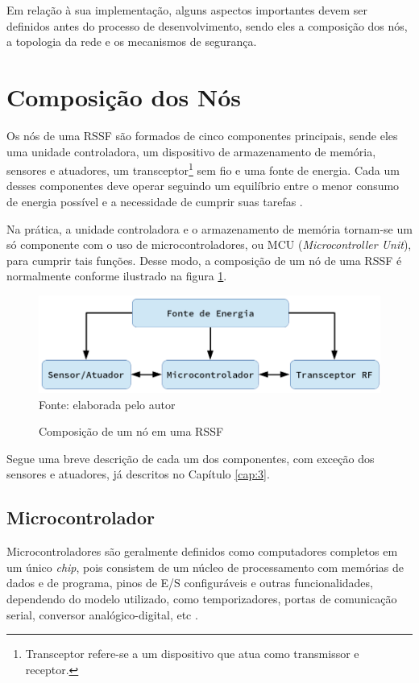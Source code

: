 Em relação à sua implementação, alguns aspectos importantes devem ser definidos antes do processo de
desenvolvimento, sendo eles a composição dos nós, a topologia da rede e os mecanismos de segurança.

\section{Composição dos Nós}
Os nós de uma RSSF são formados de cinco componentes principais, sende eles uma unidade controladora, um
dispositivo de armazenamento de memória, sensores e atuadores, um transceptor\footnote{Transceptor refere-se a
um dispositivo que atua como transmissor e receptor.} sem fio e uma fonte de energia. Cada um desses
componentes deve operar seguindo um equilíbrio entre o menor consumo de energia possível e a necessidade de
cumprir suas tarefas \cite{karl_willig2005}.

Na prática, a unidade controladora e o armazenamento de memória tornam-se um só componente com o uso de
microcontroladores, ou MCU (\textit{Microcontroller Unit}), para cumprir tais funções. Desse modo, a
composição de um nó de uma RSSF é normalmente conforme ilustrado na figura \ref{figura:node}.

\begin{figure}[h]
	\caption{Composição de um nó em uma RSSF}
	\centering
	\includegraphics[scale=0.5]{../images/node.png}
	\hspace{\linewidth}
	Fonte: elaborada pelo autor
	\label{figura:node}
\end{figure}

Segue uma breve descrição de cada um dos componentes, com exceção dos sensores e atuadores, já descritos no
Capítulo \ref{cap:3}.

\subsection{Microcontrolador}
Microcontroladores são geralmente definidos como computadores completos em um único \textit{chip}, pois
consistem de um núcleo de processamento com memórias de dados e de programa, pinos de E/S configuráveis e
outras funcionalidades, dependendo do modelo utilizado, como temporizadores, portas de comunicação serial,
conversor analógico-digital, etc \cite{williams2014,kuorilehto2007}.

